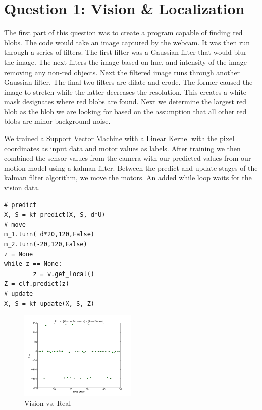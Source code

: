 \section{Question 1: Vision \& Localization}

The first part of this question was to create a program capable of finding red blobs. The code would take an image captured by the webcam. It was then run through a series of filters. The first filter was a Gaussian filter that would blur the image. The next filters the image based on hue, and intensity of the image removing any non-red objects. Next the filtered image runs through another Gaussian filter. The final two filters are dilate and erode. The former caused the image to stretch while the latter decreases the resolution. This creates a white mask designates where red blobs are found. Next we determine the largest red blob as the blob we are looking for based on the assumption that all other red blobs are minor background noise.

We trained a Support Vector Machine with a Linear Kernel with the pixel coordinates as input data and motor values as labels. After training we then combined the sensor values from the camera with our predicted values from our motion model using a kalman filter. Between the predict and update stages of the kalman filter algorithm, we move the motors. An added while loop waits for the vision data.

\begin{verbatim}
# predict 
X, S = kf_predict(X, S, d*U)
# move
m_1.turn( d*20,120,False)
m_2.turn(-20,120,False)
z = None
while z == None:
		z = v.get_local()
Z = clf.predict(z)
# update
X, S = kf_update(X, S, Z)
\end{verbatim}

\begin{figure}[tbd]
\includegraphics[width=0.5\textwidth]{images/vision_vs_real.png}
\caption{\label{vision_vs_real} Vision vs. Real}
\end{figure}

